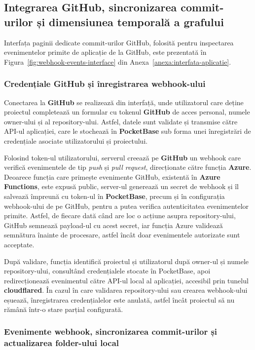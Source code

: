 \documentclass[12pt]{article}
\numberwithin{equation}{section}
\numberwithin{figure}{section}
\numberwithin{table}{section}
\theoremstyle{definition}
\theoremstyle{plain}
\newcounter{anexa}
\begin{document}
\subsection{Integrarea GitHub, sincronizarea commit-urilor și dimensiunea temporală a grafului}

Interfața paginii dedicate commit-urilor GitHub, folosită pentru inspectarea evenimentelor primite de aplicație de la GitHub, este prezentată în Figura~\ref{fig:webhook-events-interface} din Anexa~\ref{anexa:interfata-aplicatie}.

\subsubsection{Credențiale GitHub și înregistrarea webhook-ului}

Conectarea la \textbf{GitHub} se realizează din interfață, unde utilizatorul care deține proiectul completează un formular cu tokenul \textbf{GitHub} de acces personal, numele owner-ului și al repository-ului. Astfel, datele sunt validate și transmise către API-ul aplicației, care le stochează în \textbf{PocketBase} sub forma unei înregistrări de credențiale asociate utilizatorului și proiectului.

Folosind token-ul utilizatorului, serverul creează pe \textbf{GitHub} un webhook care verifică evenimentele de tip \textit{push} și \textit{pull request}, direcționate către funcția \textbf{Azure}. Deoarece funcția care primește evenimente GitHub, existentă în \textbf{Azure Functions}, este expusă public, server-ul generează un secret de webhook și îl salvează împreună cu token-ul în \textbf{PocketBase}, precum și în configurația webhook-ului de pe GitHub, pentru a putea verifica autenticitatea evenimentelor primite. Astfel, de fiecare dată când are loc o acțiune asupra repository-ului, GitHub semnează payload-ul cu acest secret, iar funcția Azure validează semnătura înainte de procesare, astfel încât doar evenimentele autorizate sunt acceptate.

După validare, funcția identifică proiectul și utilizatorul după owner-ul și numele repository-ului, consultând credențialele stocate în PocketBase, apoi redirecționează evenimentul către API-ul local al aplicației, accesibil prin tunelul \textbf{cloudflared}. În cazul în care validarea repository-ului sau crearea webhook-ului eșuează, înregistrarea credențialelor este anulată, astfel încât proiectul să nu rămână într-o stare parțial configurată.

\subsubsection{Evenimente webhook, sincronizarea commit-urilor și actualizarea folder-ului local}
\end{document}
